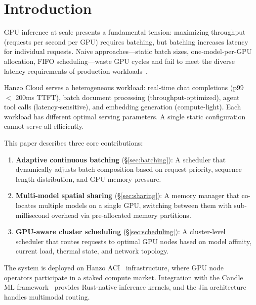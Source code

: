 \section{Introduction}

\label{sec:intro}

GPU inference at scale presents a fundamental tension: maximizing throughput
(requests per second per GPU) requires batching, but batching increases latency
for individual requests. Naive approaches---static batch sizes, one-model-per-GPU
allocation, FIFO scheduling---waste GPU cycles and fail to meet the diverse
latency requirements of production workloads~\cite{orca2022,vllm2023}.

Hanzo Cloud serves a heterogeneous workload: real-time chat completions (p99
$<$ 200ms TTFT), batch document processing (throughput-optimized), agent tool
calls (latency-sensitive), and embedding generation (compute-light). Each
workload has different optimal serving parameters. A single static configuration
cannot serve all efficiently.

This paper describes three core contributions:
\begin{enumerate}[leftmargin=1.4em]
    \item \textbf{Adaptive continuous batching} (\S\ref{sec:batching}): A
    scheduler that dynamically adjusts batch composition based on request
    priority, sequence length distribution, and GPU memory pressure.
    \item \textbf{Multi-model spatial sharing} (\S\ref{sec:sharing}): A memory
    manager that co-locates multiple models on a single GPU, switching between
    them with sub-millisecond overhead via pre-allocated memory partitions.
    \item \textbf{GPU-aware cluster scheduling} (\S\ref{sec:scheduling}): A
    cluster-level scheduler that routes requests to optimal GPU nodes based on
    model affinity, current load, thermal state, and network topology.
\end{enumerate}

The system is deployed on Hanzo ACI~\cite{hanzoaci} infrastructure, where GPU
node operators participate in a staked compute market. Integration with the
Candle ML framework~\cite{hanzocandle} provides Rust-native inference kernels,
and the Jin architecture~\cite{hanzojin} handles multimodal routing.

